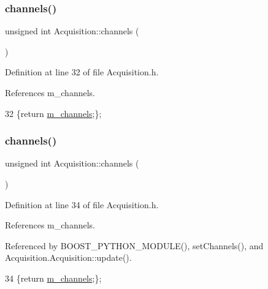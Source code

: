 \subsubsection{\texorpdfstring{channels()}{channels()}\hspace{0.1cm}{\footnotesize\ttfamily [1/2]}}
{\footnotesize\ttfamily unsigned int Acquisition\+::channels (\begin{DoxyParamCaption}{ }\end{DoxyParamCaption})\hspace{0.3cm}{\ttfamily [inline]}}



Definition at line 32 of file Acquisition.\+h.



References m\+\_\+channels.


\begin{DoxyCode}
32 \{\textcolor{keywordflow}{return} \hyperlink{classAcquisition_aedc8b29f322ef00540797fbd0d5112d1}{m\_channels};\};
\end{DoxyCode}
\mbox{\label{classAcquisition_a3041537afcb4dfe5c6940f0ef6829265}} 
\subsubsection{\texorpdfstring{channels()}{channels()}\hspace{0.1cm}{\footnotesize\ttfamily [2/2]}}
{\footnotesize\ttfamily unsigned int Acquisition\+::channels (\begin{DoxyParamCaption}{ }\end{DoxyParamCaption})\hspace{0.3cm}{\ttfamily [inline]}}



Definition at line 34 of file Acquisition.\+h.



References m\+\_\+channels.



Referenced by B\+O\+O\+S\+T\+\_\+\+P\+Y\+T\+H\+O\+N\+\_\+\+M\+O\+D\+U\+L\+E(), set\+Channels(), and Acquisition.\+Acquisition\+::update().


\begin{DoxyCode}
34 \{\textcolor{keywordflow}{return} \hyperlink{classAcquisition_aedc8b29f322ef00540797fbd0d5112d1}{m\_channels};\};
\end{DoxyCode}
\mbox{\label{classProcessus_aaeb17673b98d2b39f3aa780e335e0968}} 
